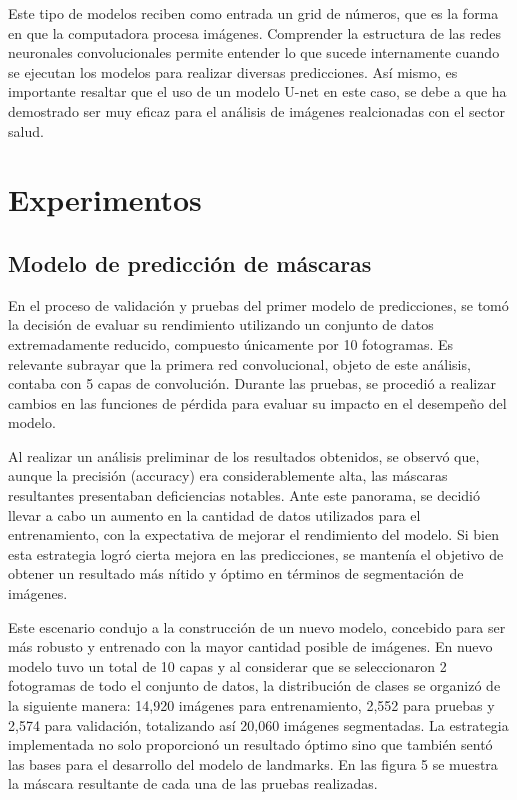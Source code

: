 \documentclass[runningheads]{llncs}
\begin{document}
Este tipo de modelos reciben como entrada un grid de números, que es la forma en que la computadora procesa imágenes. Comprender la estructura de las redes neuronales convolucionales permite entender lo que sucede internamente cuando se ejecutan los modelos para realizar diversas predicciones. Así mismo, es importante resaltar que el uso de un modelo U-net en este caso, se debe a que ha demostrado ser muy eficaz para el análisis de imágenes realcionadas con el sector salud.

\section{Experimentos}

\subsection{Modelo de predicción de máscaras}

En el proceso de validación y pruebas del primer modelo de predicciones, se tomó la decisión de evaluar su rendimiento utilizando un conjunto de datos extremadamente reducido, compuesto únicamente por 10 fotogramas. Es relevante subrayar que la primera red convolucional, objeto de este análisis, contaba con 5 capas de convolución. Durante las pruebas, se procedió a realizar cambios en las funciones de pérdida para evaluar su impacto en el desempeño del modelo.

Al realizar un análisis preliminar de los resultados obtenidos, se observó que, aunque la precisión (accuracy) era considerablemente alta, las máscaras resultantes presentaban deficiencias notables. Ante este panorama, se decidió llevar a cabo un aumento en la cantidad de datos utilizados para el entrenamiento, con la expectativa de mejorar el rendimiento del modelo. Si bien esta estrategia logró cierta mejora en las predicciones, se mantenía el objetivo de obtener un resultado más nítido y óptimo en términos de segmentación de imágenes.

Este escenario condujo a la construcción de un nuevo modelo, concebido para ser más robusto y entrenado con la mayor cantidad posible de imágenes. En nuevo modelo tuvo un total de 10 capas y al considerar que se seleccionaron 2 fotogramas de todo el conjunto de datos, la distribución de clases se organizó de la siguiente manera: 14,920 imágenes para entrenamiento, 2,552 para pruebas y 2,574 para validación, totalizando así 20,060 imágenes segmentadas. La estrategia implementada no solo proporcionó un resultado óptimo sino que también sentó las bases para el desarrollo del modelo de landmarks. En las figura 5 se muestra la máscara resultante de cada una de las pruebas realizadas. 
\end{document}
